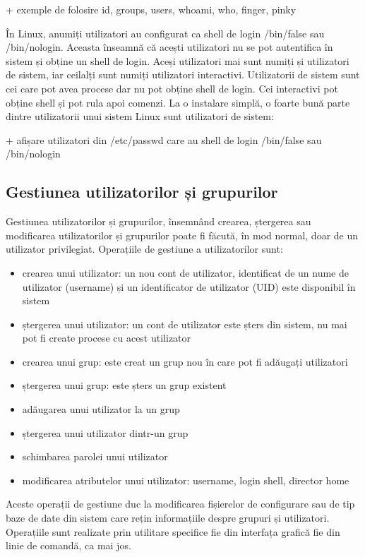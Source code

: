 + exemple de folosire id, groups, users, whoami, who, finger, pinky

În Linux, anumiți utilizatori au configurat ca shell de login /bin/false sau
/bin/nologin. Aceasta înseamnă că acești utilizatori nu se pot autentifica în
sistem și obține un shell de login. Aceși utilizatori mai sunt numiți și
utilizatori de sistem, iar ceilalți sunt numiți utilizatori interactivi.
Utilizatorii de sistem sunt cei care pot avea procese dar nu pot obține shell de
login. Cei interactivi pot obține shell și pot rula apoi comenzi. La o instalare
simplă, o foarte bună parte dintre utilizatorii unui sistem Linux sunt
utilizatori de sistem:

+ afișare utilizatori din /etc/passwd care au shell de login /bin/false sau /bin/nologin

\subsection{Gestiunea utilizatorilor și grupurilor}
\label{sec:users-ops-groups}

Gestiunea utilizatorilor și grupurilor, însemnând crearea, ștergerea sau
modificarea utilizatorilor și grupurilor poate fi făcută, în mod normal, doar de
un utilizator privilegiat. Operațiile de gestiune a utilizatorilor sunt:

\begin{itemize}
	\item crearea unui utilizator: un nou cont de utilizator, identificat de
		un nume de utilizator (username) și un identificator de
		utilizator (UID) este disponibil în sistem
	\item ștergerea unui utilizator: un cont de utilizator este șters din
		sistem, nu mai pot fi create procese cu acest utilizator
	\item crearea unui grup: este creat un grup nou în care pot fi adăugați utilizatori
	\item ștergerea unui grup: este șters un grup existent
	\item adăugarea unui utilizator la un grup
	\item ștergerea unui utilizator dintr-un grup
	\item schimbarea parolei unui utilizator
	\item modificarea atributelor unui utilizator: username, login shell,
		director home
\end{itemize}
Aceste operații de gestiune duc la modificarea fișierelor de configurare sau de
tip baze de date din sistem care rețin informațiile despre grupuri și
utilizatori. Operațiile sunt realizate prin utilitare specifice fie din
interfața grafică fie din linie de comandă, ca mai jos.

